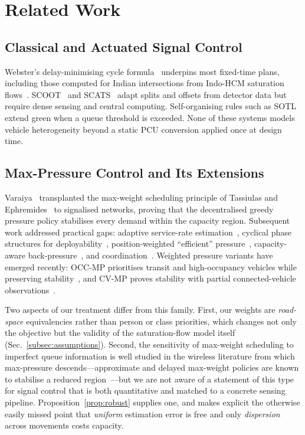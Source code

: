 \documentclass[journal]{IEEEtran}
\begin{document}
\section{Related Work}
\label{sec:related}

\subsection{Classical and Actuated Signal Control}
Webster's delay-minimising cycle formula~\cite{b_webster} underpins most
fixed-time plans, including those computed for Indian intersections from
Indo-HCM saturation flows~\cite{b_indohcm}. SCOOT~\cite{b_scoot} and
SCATS~\cite{b_scats} adapt splits and offsets from detector data but
require dense sensing and central computing. Self-organising rules such
as SOTL~\cite{b_sotl} extend green when a queue threshold is exceeded.
None of these systems models vehicle heterogeneity beyond a static PCU
conversion applied once at design time.

\subsection{Max-Pressure Control and Its Extensions}
Varaiya~\cite{b_varaiya} transplanted the max-weight scheduling principle
of Tassiulas and Ephremides~\cite{b_tassiulas} to signalised networks,
proving that the decentralised greedy pressure policy stabilises every
demand within the capacity region. Subsequent work addressed practical
gaps: adaptive service-rate estimation~\cite{b_lioris}, cyclical phase
structures for deployability~\cite{b_anderson,b_levin},
position-weighted ``efficient'' pressure~\cite{b_efficientmp},
capacity-aware back-pressure~\cite{b_capacityaware}, and
coordination~\cite{b_cmp}. Weighted pressure variants have emerged
recently: OCC-MP prioritises transit and high-occupancy vehicles while
preserving stability~\cite{b_occmp}, and CV-MP proves stability with
partial connected-vehicle observations~\cite{b_cvmp}.

Two aspects of our treatment differ from this family. First, our weights
are \emph{road-space} equivalencies rather than person or class
priorities, which changes not only the objective but the validity of the
saturation-flow model itself (Sec.~\ref{subsec:assumptions}). Second, the
sensitivity of max-weight scheduling to imperfect queue information is
well studied in the wireless literature from which max-pressure
descends---approximate and delayed max-weight policies are known to
stabilise a reduced region~\cite{b_tassiulas,b_neely}---but we are not
aware of a statement of this type for signal control that is both
quantitative and matched to a concrete sensing pipeline.
Proposition~\ref{prop:robust} supplies one, and makes explicit the
otherwise easily missed point that \emph{uniform} estimation error is
free and only \emph{dispersion} across movements costs capacity.
\end{document}
